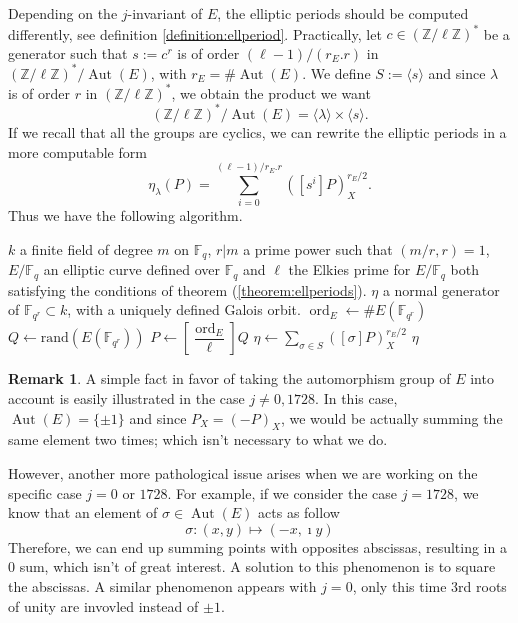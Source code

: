 \documentclass[12pt]{article}
\theoremstyle{plain}
\theoremstyle{definition}
\newtheorem*{remark}{Remark}
\DeclareMathOperator{\order}{ord} %
\DeclareMathOperator{\Aut}{Aut}
\def\Z{\ensuremath{\mathbb{Z}}}
\def\F{\ensuremath{\mathbb{F}}}
\newcounter{algorithm}
\begin{document}
Depending on the $j$-invariant of $E$, the elliptic periods should be computed 
differently, see definition \ref{definition:ellperiod}. Practically, let 
$c\in(\Z/\ell\Z)^{\ast}$ be a generator such that $s:=c^r$ is of order 
$(\ell-1)/(r_E.r)$ in $(\Z/\ell\Z)^{\ast}/\Aut(E)$, with 
$r_E=\#\Aut(E)$. We define $S:=\langle{s}\rangle$ and since $\lambda$ 
is of order $r$ in $(\Z/\ell\Z)^{\ast}$, we obtain the product we want
\[
(\Z/\ell\Z)^{\ast}/\Aut(E)=\langle{\lambda}\rangle\times\langle{s}\rangle.
\]
If we recall that all the groups are cyclics, we can rewrite the elliptic 
periods in a more computable form
\begin{equation}
\eta_\lambda(P)=\sum_{i=0}^{(\ell-1)/r_E.r}
{\left([s^i]P\right)_X^{r_E/2}}.
\end{equation}
Thus we have the following algorithm.

\begin{algorithm}
\label{algorithm:compell}
    \begin{algorithmic}[1]
    \REQUIRE $k$ a finite field of degree $m$ on $\F_q$, $r|m$ a prime power
such that $(m/r,r) = 1$, $E/\F_q$ an elliptic curve defined over $\F_q$ and 
$\ell$ the Elkies prime for $E/\F_q$ both satisfying the conditions of theorem
(\ref{theorem:ellperiods}).
    \ENSURE $\eta$ a normal generator of $\F_{q^r}\subset k$, with a uniquely
defined Galois orbit.
    \STATE $\order_E\leftarrow\#E(\F_{q^r})$
    \REPEAT
        \STATE $Q\leftarrow\text{rand}(E(\F_{q^r}))$
        \STATE $P\leftarrow[\dfrac{\order_E}{\ell}]Q$
    \STATE $\eta\leftarrow\sum_{\sigma\in S}{\left([\sigma]P\right)_X^{r_E/2}}$
    \RETURN $\eta$
    \end{algorithmic}
\end{algorithm}

\begin{remark}
A simple fact in favor of taking the automorphism group of $E$ into account is
easily illustrated in the case $j\neq0,1728$. In this case, $\Aut(E) =
\lbrace{\pm1}\rbrace$ and since $P_X = (-P)_X$, we would be actually summing the
same element two times; which isn't necessary to what we do.

However, another more pathological issue arises when we are working on the
specific case $j = 0$ or $1728$. For example, if we consider the case $j =
1728$, we know that an element of $\sigma\in\Aut(E)$ acts as follow
\[
\sigma:(x,y)\mapsto(-x,\imath y)
\]
Therefore, we can end up summing points with opposites abscissas, resulting in a
$0$ sum, which isn't of great interest. A solution to this phenomenon is to
square the abscissas. A similar phenomenon appears with $j = 0$, only this time
$3$rd roots of unity are invovled instead of $\pm1$.
\end{remark}
\end{document}
